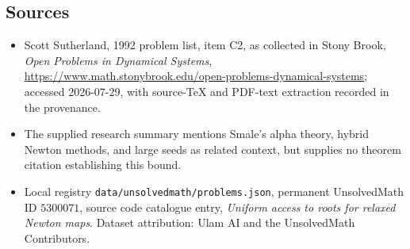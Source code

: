 \documentclass[11pt]{article}
\begin{document}
\subsection{Sources}
\begin{itemize}
\item Scott Sutherland, 1992 problem list, item C2, as collected in Stony Brook, \emph{Open Problems in Dynamical Systems}, \url{https://www.math.stonybrook.edu/open-problems-dynamical-systems}; accessed 2026-07-29, with source-TeX and PDF-text extraction recorded in the provenance.
\item The supplied research summary mentions Smale's alpha theory, hybrid Newton methods, and large seeds as related context, but supplies no theorem citation establishing this bound.
\item Local registry \texttt{data/unsolvedmath/problems.json}, permanent UnsolvedMath ID $5300071$, source code catalogue entry, \emph{Uniform access to roots for relaxed Newton maps}. Dataset attribution: Ulam AI and the UnsolvedMath Contributors.
\end{itemize}
\end{document}
